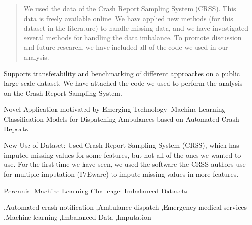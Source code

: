 \documentclass[fleqn]{cas-sc}
\begin{document}
\begin{abstract}
We used the data of the Crash Report Sampling System (CRSS).%
This data is freely available online.  We have applied new methods (for this dataset in the literature) to handle missing data, and we have investigated several methods for handling the data imbalance.  To promote discussion and future research, we have included all of the code we used in our analysis.  

\end{abstract}


\begin{highlights}
	\item  Supports transferability and benchmarking of different approaches on a public large-scale dataset.  We have attached the code we used to perform the analysis on the Crash Report Sampling System.  
	\item Novel Application motivated by Emerging Technology:  Machine Learning Classification Models for Dispatching Ambulances based on Automated Crash Reports
	\item New Use of Dataset:  Used Crash Report Sampling System (CRSS), which has imputed missing values for some features, but not all of the ones we wanted to use.  For the first time we have seen, we used the software the CRSS authors use for multiple imputation (IVEware) to impute missing values in more features.  
	\item Perennial Machine Learning Challenge:  Imbalanced Datasets.
\end{highlights}

\begin{keywords}
 \sep Automated crash notification \sep Ambulance dispatch \sep Emergency medical services  \sep Machine learning \sep Imbalanced Data \sep Imputation
\end{keywords}

\maketitle


%
%
%
\end{document}
